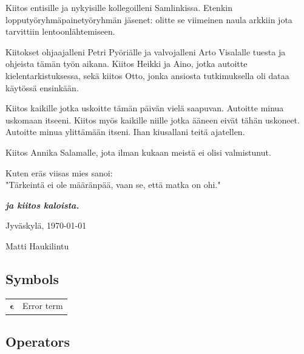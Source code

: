 \documentclass[english, 12pt, a4paper, elec, utf8, a-1b, online]{aaltothesis}
\begin{document}
\bigskip

\noindent
Kiitos entisille ja nykyisille kollegoilleni Samlinkissa.
Etenkin lopputyöryhmäpainetyöryhmän jäsenet:
olitte se viimeinen naula arkkiin jota tarvittiin lentoonlähtemiseen.

\bigskip

\noindent
Kiitokset ohjaajalleni Petri Pyöriälle ja valvojalleni Arto Visalalle tuesta ja ohjeista tämän työn aikana.
Kiitos Heikki ja Aino, jotka autoitte kielentarkistuksessa,
sekä kiitos Otto, jonka ansiosta tutkimuksella oli dataa käytössä ensinkään.

\bigskip

\noindent
Kiitos kaikille jotka uskoitte tämän päivän vielä saapuvan.
Autoitte minua uskomaan itseeni.
Kiitos myös kaikille niille jotka ääneen eivät tähän uskoneet.
Autoitte minua ylittämään itseni.
Ihan kiusallani teitä ajatellen.

\bigskip

\noindent
Kiitos Annika Salamalle, jota ilman kukaan meistä ei olisi valmistunut.

\bigskip

\noindent
Kuten eräs viisas mies sanoi: \\
"Tärkeintä ei ole määränpää, vaan se, että matka on ohi."

\bigskip
\bigskip

\textbf{\textit{ja kiitos kaloista.}}


\vspace{4.5cm}
Jyväskylä, {\today}

\vspace{5mm}
{\hfill Matti Haukilintu \hspace{1cm}}

\newpage


\thesistableofcontents



\subsection*{Symbols}

\begin{tabular}{ll}
  $\mathbf{\epsilon}$  & Error term
\end{tabular}

\subsection*{Operators}
\end{document}
